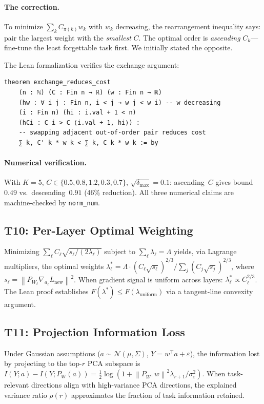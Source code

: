 \documentclass[11pt,a4paper]{article}
\theoremstyle{definition}
\newcommand{\proj}[1]{P_{#1}}
\newcommand{\norm}[1]{\left\|#1\right\|}
\begin{document}
\paragraph{The correction.} To minimize $\sum_k C_{\pi(k)} w_k$ with $w_k$ decreasing, the rearrangement inequality says: pair the largest weight with the \emph{smallest} $C$. The optimal order is \emph{ascending} $C_k$---fine-tune the least forgettable task first. We initially stated the opposite.

The Lean formalization verifies the exchange argument:
\begin{lstlisting}[style=lean]
theorem exchange_reduces_cost
    (n : ℕ) (C : Fin n → ℝ) (w : Fin n → ℝ)
    (hw : ∀ i j : Fin n, i < j → w j < w i) -- w decreasing
    (i : Fin n) (hi : i.val + 1 < n)
    (hCi : C i > C ⟨i.val + 1, hi⟩) :
    -- swapping adjacent out-of-order pair reduces cost
    ∑ k, C' k * w k < ∑ k, C k * w k := by
\end{lstlisting}

\paragraph{Numerical verification.} With $K = 5$, $C \in \{0.5, 0.8, 1.2, 0.3, 0.7\}$, $\sqrt{\delta_{\max}} = 0.1$: ascending~$C$ gives bound~$0.49$ vs.\ descending~$0.91$ (46\% reduction). All three numerical claims are machine-checked by \texttt{norm\_num}.

\subsection{T10: Per-Layer Optimal Weighting}

Minimizing $\sum_\ell C_\ell \sqrt{s_\ell / (2\lambda_\ell)}$ subject to $\sum_\ell \lambda_\ell = \Lambda$ yields, via Lagrange multipliers, the optimal weights $\lambda_\ell^* = \Lambda \cdot (C_\ell \sqrt{s_\ell})^{2/3} / \sum_j (C_j \sqrt{s_j})^{2/3}$, where $s_\ell = \norm{\proj{W_\ell}\nabla_{a_\ell} L_{\mathrm{new}}}^2$. When gradient signal is uniform across layers: $\lambda_\ell^* \propto C_\ell^{2/3}$. The Lean proof establishes $F(\lambda^*) \leq F(\lambda_{\mathrm{uniform}})$ via a tangent-line convexity argument.

\subsection{T11: Projection Information Loss}

Under Gaussian assumptions ($a \sim \mathcal{N}(\mu, \Sigma)$, $Y = w^\top a + \varepsilon$), the information lost by projecting to the top-$r$ PCA subspace is $I(Y; a) - I(Y; \proj{W}(a)) = \frac{1}{2}\log(1 + \norm{\proj{W^\perp} w}^2 \lambda_{r+1} / \sigma_\varepsilon^2)$. When task-relevant directions align with high-variance PCA directions, the explained variance ratio $\rho(r)$ approximates the fraction of task information retained.
\end{document}
